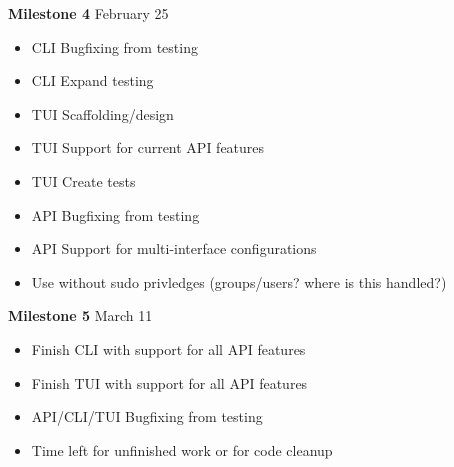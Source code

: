 \documentclass[11pt]{article}
\begin{document}
\textbf{Milestone 4} February 25
\begin{itemize}
  \item CLI Bugfixing from testing
  \item CLI Expand testing
  \item TUI Scaffolding/design
  \item TUI Support for current API features
  \item TUI Create tests
  \item API Bugfixing from testing
  \item API Support for multi-interface configurations
  \item Use without sudo privledges (groups/users? where is this handled?)
\end{itemize}

\textbf{Milestone 5} March 11
\begin{itemize}
  \item Finish CLI with support for all API features
  \item Finish TUI with support for all API features
  \item API/CLI/TUI Bugfixing from testing
  \item Time left for unfinished work or for code cleanup
\end{itemize}
\end{document}
